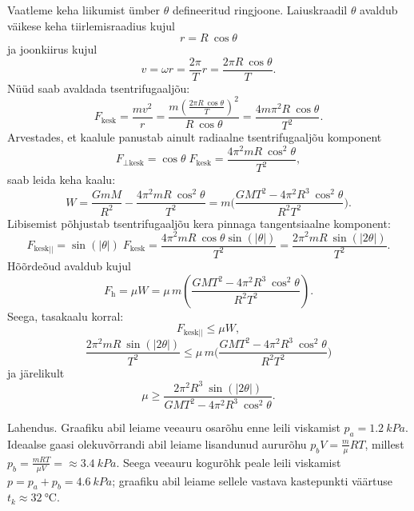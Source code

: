 \documentclass[10pt]{article}
\begin{document}
\solu
\osa Vaatleme keha liikumist ümber $\theta$ defineeritud ringjoone. Laiuskraadil $\theta$ avaldub väikese keha tiirlemisraadius kujul
\[
  r=R \: \cos \theta
\]
ja joonkiirus kujul
\[
  v= \omega r= \frac{2 \pi }{T} r = \frac{2 \pi R \: \cos \theta}{T}.
\]
Nüüd saab avaldada tsentrifugaaljõu:
\[
  F_{\mathrm{ kesk}}=\frac{m v^2}{r} =\frac{m \left(\frac{2 \pi R \: \cos \theta}{T}\right)^2}{R \: \cos \theta}=\frac{4 m \pi^2 R \: \cos \theta}{T^2}.
\]
Arvestades, et kaalule panustab ainult radiaalne tsentrifugaaljõu komponent
\[
  F_{\mathrm{\bot kesk}}= \cos \theta \; F_{\mathrm{ kesk}} = \frac{4 \pi^2 m R \: \cos ^2 \theta}{T^2},
\]
saab leida keha kaalu:
\[
  W=\frac{G m M}{R^2} - \frac{4 \pi^2 m R \: \cos ^2 \theta}{T^2} = m\bigg(\frac{G M T^2 - 4 \pi^2 R^3 \: \cos ^2 \theta }{R^2 T^2}\bigg).
\]
\osa Libisemist põhjustab tsentrifugaaljõu kera pinnaga tangentsiaalne komponent:
\[
  F_{\mathrm{kesk || }}= \sin(|\theta|) \; F_{\mathrm{ kesk}} = \frac{4 \pi^2 m R \: \cos \theta \sin(|\theta|)}{T^2}=\frac{2 \pi^2 m R \: \sin(|2\theta|)}{T^2} .
\]
Hõõrdeõud avaldub kujul
\[
  F_{\mathrm{h}}=\mu W = \mu \, m\left(\frac{G M T^2 - 4 \pi^2 R^3 \: \cos ^2 \theta }{R^2 T^2}\right).
\]
Seega, tasakaalu korral:
\[
  F_{\mathrm{kesk || }} \leq \mu W,
\]
\[
  \frac{2 \pi^2 m R \: \sin(|2\theta|)}{T^2} \leq
  \mu \, m\bigg(\frac{G M T^2 - 4 \pi^2 R^3 \: \cos ^2 \theta }{R^2 T^2}\bigg)
\]
ja järelikult
\[
  \mu \geq \frac{2 \pi^2 R^3 \: \sin(|2\theta|)}{G M T^2 - 4 \pi^2 R^3 \: \cos ^2 \theta }.
\]
\probend
\bigskip


\solu
Lahendus. Graafiku abil leiame veeauru osarõhu enne leili viskamist $p_a=\SI{1.2}{kPa}$. Ideaalse gaasi olekuvõrrandi abil leiame lisandunud aururõhu $p_bV=\frac m\mu RT$, millest $p_b=\frac {mRT}{\mu V}=\approx \SI{3.4}{kPa}$. Seega veeauru kogurõhk peale leili viskamist $p=p_a+p_b=\SI{4.6}{kPa}$; graafiku abil leiame sellele vastava kastepunkti väärtuse $t_k\approx \SI{32}\celsius$.
\probend
\bigskip

\end{document}
